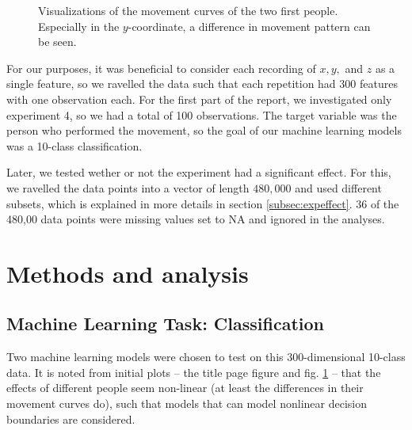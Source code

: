 \documentclass[11pt,fleqn]{article}
\begin{document}
\begin{figure}[H]
	
	\centering
	\caption{Visualizations of the movement curves of the two first people. Especially in the \(y\)-coordinate, a difference in movement pattern can be seen.}
	\label{fig:2dtrajects}
\end{figure}\noindent 
For our purposes, it was beneficial to consider each recording of $ x, y, $ and $ z $ as a single feature, so we ravelled the data such that each repetition had $ 300 $ features with one observation each.
For the first part of the report, we investigated only experiment 4, so we had a total of 100 observations.
The target variable was the person who performed the movement, so the goal of our machine learning models was a 10-class classification.

Later, we tested wether or not the experiment had a significant effect.
For this, we ravelled the data points into a vector of length $ 480,000 $ and used different subsets, which is explained in more details in section \ref{subsec:expeffect}. 36 of the 480,00 data points were missing values set to NA and ignored in the analyses.



\section{Methods and analysis}


\subsection{Machine Learning Task: Classification}
Two machine learning models were chosen to test on this 300-dimensional 10-class data.
It is noted from initial plots -- the title page figure and fig. \ref{fig:2dtrajects} -- that the effects of different people seem non-linear (at least the differences in their movement curves do), such that models that can model nonlinear decision boundaries are considered.
\end{document}
